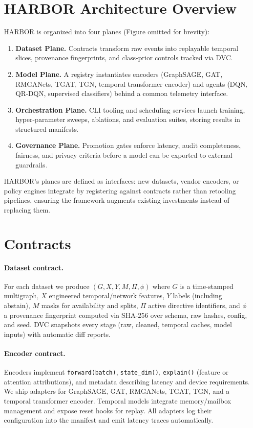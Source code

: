 \documentclass[letterpaper]{article}
\begin{document}
\section{HARBOR Architecture Overview}
\textsc{HARBOR} is organized into four planes (Figure omitted for brevity):
\begin{enumerate}
    \item \textbf{Dataset Plane.} Contracts transform raw events into replayable temporal slices, provenance fingerprints, and class-prior controls tracked via DVC.
    \item \textbf{Model Plane.} A registry instantiates encoders (GraphSAGE, GAT, RMGANets, TGAT, TGN, temporal transformer encoder) and agents (DQN, QR-DQN, supervised classifiers) behind a common telemetry interface.
    \item \textbf{Orchestration Plane.} CLI tooling and scheduling services launch training, hyper-parameter sweeps, ablations, and evaluation suites, storing results in structured manifests.
    \item \textbf{Governance Plane.} Promotion gates enforce latency, audit completeness, fairness, and privacy criteria before a model can be exported to external guardrails.
\end{enumerate}
\textsc{HARBOR}'s planes are defined as interfaces: new datasets, vendor encoders, or policy engines integrate by registering against contracts rather than retooling pipelines, ensuring the framework augments existing investments instead of replacing them.

\section{Contracts}
\label{sec:contracts}
\paragraph{Dataset contract.} For each dataset we produce $(G, X, Y, M, \Pi, \phi)$ where $G$ is a time-stamped multigraph, $X$ engineered temporal/network features, $Y$ labels (including abstain), $M$ masks for availability and splits, $\Pi$ active directive identifiers, and $\phi$ a provenance fingerprint computed via SHA-256 over schema, raw hashes, config, and seed. DVC snapshots every stage (raw, cleaned, temporal caches, model inputs) with automatic diff reports.

\paragraph{Encoder contract.} Encoders implement \texttt{forward(batch)}, \texttt{state\_dim()}, \texttt{explain()} (feature or attention attributions), and metadata describing latency and device requirements. We ship adapters for GraphSAGE, GAT, RMGANets, TGAT, TGN, and a temporal transformer encoder. Temporal models integrate memory/mailbox management and expose reset hooks for replay. All adapters log their configuration into the manifest and emit latency traces automatically.
\end{document}
